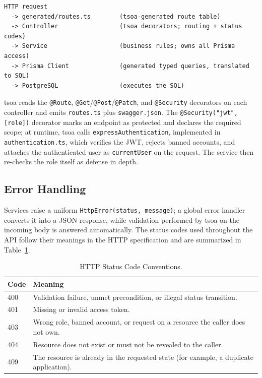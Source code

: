 \begin{verbatim}
HTTP request
  -> generated/routes.ts        (tsoa-generated route table)
  -> Controller                 (tsoa decorators; routing + status codes)
  -> Service                    (business rules; owns all Prisma access)
  -> Prisma Client              (generated typed queries, translated to SQL)
  -> PostgreSQL                 (executes the SQL)
\end{verbatim}

tsoa reads the \texttt{@Route}, \texttt{@Get}/\texttt{@Post}/\texttt{@Patch}, and \texttt{@Security} decorators on each controller and emits \texttt{routes.ts} plus \texttt{swagger.json}. The \texttt{@Security("jwt", [role])} decorator marks an endpoint as protected and declares the required scope; at runtime, tsoa calls \texttt{expressAuthentication}, implemented in \texttt{authentication.ts}, which verifies the JWT, rejects banned accounts, and attaches the authenticated user as \texttt{currentUser} on the request. The service then re-checks the role itself as defense in depth.

\subsection{Error Handling}

Services raise a uniform \texttt{HttpError(status, message)}; a global error handler converts it into a JSON response, while validation performed by tsoa on the incoming body is answered automatically. The status codes used throughout the API follow their meanings in the HTTP specification \cite{rfc9110} and are summarized in Table~\ref{tab:http-codes}.

\begin{table}[H]
	\centering
	\caption{HTTP Status Code Conventions.}
	\label{tab:http-codes}
	\begin{tabular}{|p{2.2cm}|p{11.8cm}|}
		\hline
		\textbf{Code} & \textbf{Meaning} \\
		\hline
		400 & Validation failure, unmet precondition, or illegal status transition. \\
		\hline
		401 & Missing or invalid access token. \\
		\hline
		403 & Wrong role, banned account, or request on a resource the caller does not own. \\
		\hline
		404 & Resource does not exist or must not be revealed to the caller. \\
		\hline
		409 & The resource is already in the requested state (for example, a duplicate application). \\
		\hline
	\end{tabular}
\end{table}

